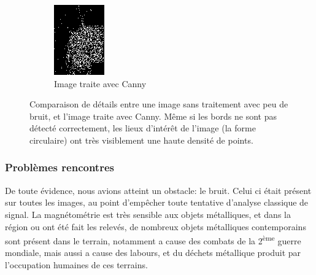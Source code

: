 \documentclass[a4paper, 12pt, titlepage, oneside, french]{article}
\begin{document}
\begin{figure}[H]
		\begin{subfigure}[]{0.4\linewidth}
			\includegraphics[width=\linewidth]{CANNY_ExempleDetailsB.png}
			\caption{Image traite avec Canny}
		\end{subfigure}
		\caption{Comparaison de détails entre une image sans traitement avec peu de bruit, et l'image traite avec Canny. Même si les bords ne sont pas détecté correctement, les lieux d'intérêt de l'image (la forme circulaire) ont très visiblement une haute densité de points.}
		\label{fig:CannyDetails}
	\end{figure}

	\subsubsection{Problèmes rencontres}
	De toute évidence, nous avions atteint un obstacle: le bruit. Celui ci était présent sur toutes les images, au point d'empêcher toute tentative d'analyse classique de signal. La magnétométrie est très sensible aux objets métalliques, et dans la région ou ont été fait les relevés, de nombreux objets métalliques contemporains sont présent dans le terrain, notamment a cause des combats de la 2\textsuperscript{ème} guerre mondiale, mais aussi a cause des labours, et du déchets métallique produit par l'occupation humaines de ces terrains.
\end{document}
